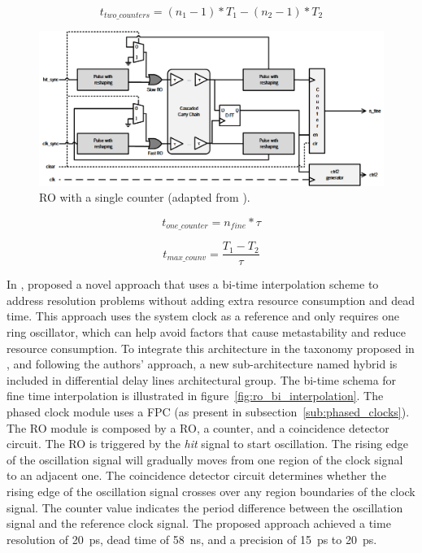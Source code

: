 \begin{equation}
	t_{two\_counters} = (n_{1} - 1) * T_{1} - (n_{2} - 1) * T_{2}
	\label{eq:ro_2cnt_measure}
\end{equation}

\begin{figure}[ht!]
	\centering
	\includegraphics[width=.9\textwidth]{img/02_StateofArt/RO_1cnt .png}
	\caption{RO with a single counter (adapted from \citep{ro_1_counter}).}
	\label{fig:ro_1_cnt}
\end{figure}

\begin{equation}
	t_{one\_counter} = n_{fine} * \tau
	\label{eq:ro_1cnt_measure}
\end{equation}

\begin{equation}
	t_{max\_counv} = \frac {T_{1} - T_{2}} {\tau}
	\label{eq:ro_2cnt_max_cnt}
\end{equation}

In \citeyear{ro_bi_interpolation}, \citet{ro_bi_interpolation} proposed a novel approach that uses a bi-time interpolation scheme to address resolution problems without adding extra resource consumption and dead time. This approach uses the system clock as a reference and only requires one ring oscillator, which can help avoid factors that cause metastability and reduce resource consumption. To integrate this architecture in the taxonomy proposed in \citep{machado_ov}, and following the authors' approach, a new sub-architecture named hybrid is included in differential delay lines architectural group. The bi-time schema for fine time interpolation is illustrated in figure~\ref{fig:ro_bi_interpolation}. The phased clock module uses a \gls{FPC} (as present in subsection~\ref{sub:phased_clocks}). The \acrlong{RO} module is composed by a \gls{RO}, a counter, and a coincidence detector circuit. The \gls{RO} is triggered by the \textit{hit} signal to start oscillation. The rising edge of the oscillation signal will gradually moves from one region of the clock signal to an adjacent one. The coincidence detector circuit determines whether the rising edge of the oscillation signal crosses over any region boundaries of the clock signal. The counter value indicates the period difference between the oscillation signal and the reference clock signal. The proposed approach achieved a time resolution of 20~ps, dead time of 58~ns, and a precision of 15~ps to 20~ps.

